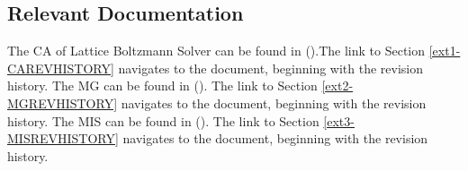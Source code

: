 \documentclass[12pt, titlepage]{article}
\newcommand{\famname}{Lattice Boltzmann Solver}
\begin{document}

\subsection{Relevant Documentation}

The CA of {\famname} can be found in (\citet{LBM_CA_PM}).The link to Section \ref{ext1-CAREVHISTORY} navigates to the document, beginning with the revision history. The MG can be found in (\citet{LBM_MG_PM}). The link to Section \ref{ext2-MGREVHISTORY} navigates to the document, beginning with the revision history. The MIS can be found in (\citet{LBM_MIS_PM}). The link to Section \ref{ext3-MISREVHISTORY} navigates to the document, beginning with the revision history.
\newpage
\end{document}
